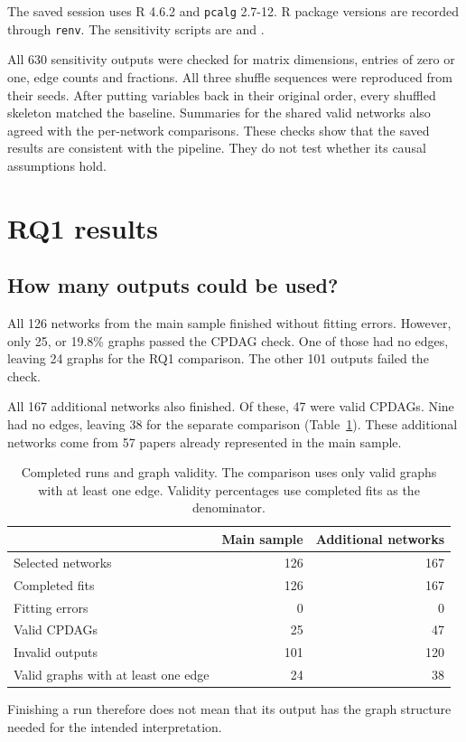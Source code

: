 \documentclass[11pt,a4paper]{article}
\begin{document}
The saved session uses R 4.6.2 and \texttt{pcalg} 2.7-12. R package versions are recorded through \texttt{renv}. The sensitivity scripts are  and .

All 630 sensitivity outputs were checked for matrix dimensions, entries of zero or one, edge counts and fractions. All three shuffle sequences were reproduced from their seeds. After putting variables back in their original order, every shuffled skeleton matched the baseline. Summaries for the shared valid networks also agreed with the per-network comparisons. These checks show that the saved results are consistent with the pipeline. They do not test whether its causal assumptions hold.

\section{RQ1 results}\label{sec:results}
\subsection{How many outputs could be used?}
All 126 networks from the main sample finished without fitting errors. However, only 25, or 19.8\% graphs passed the CPDAG check. One of those had no edges, leaving 24 graphs for the RQ1 comparison. The other 101 outputs failed the check.

All 167 additional networks also finished. Of these, 47 were valid CPDAGs. Nine had no edges, leaving 38 for the separate comparison (Table~\ref{tab:counts}). These additional networks come from 57 papers already represented in the main sample.

\begin{table}[!htbp]
\centering
\caption{Completed runs and graph validity. The comparison uses only valid graphs with at least one edge. Validity percentages use completed fits as the denominator.}
\label{tab:counts}
\begin{tabular}{@{}lrr@{}}
\toprule
 & Main sample & Additional networks\\
\midrule
Selected networks & 126 & 167\\
Completed fits & 126 & 167\\
Fitting errors & 0 & 0\\
Valid CPDAGs & 25 & 47\\
Invalid outputs & 101 & 120\\
Valid graphs with at least one edge & 24 & 38\\
\bottomrule
\end{tabular}
\end{table}
Finishing a run therefore does not mean that its output has the graph structure needed for the intended interpretation.
\end{document}
